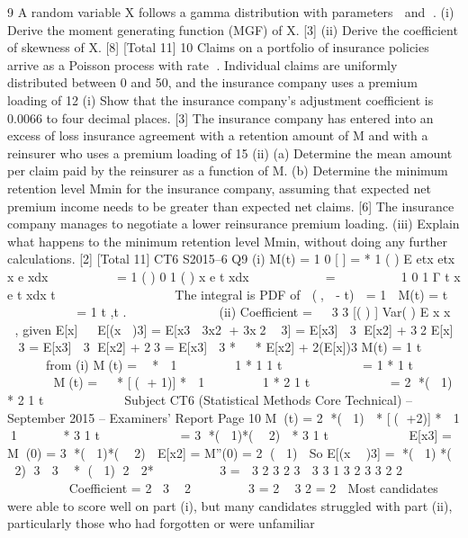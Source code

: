 
9 A random variable X follows a gamma distribution with parameters  and .
(i) Derive the moment generating function (MGF) of X. [3]
(ii) Derive the coefficient of skewness of X. [8]
[Total 11]
10 Claims on a portfolio of insurance policies arrive as a Poisson process with  rate . Individual claims are uniformly distributed between 0 and 50, and the
insurance company uses a premium loading of 12%
(i) Show that the insurance company’s adjustment coefficient is 0.0066 to four
decimal places. [3]
The insurance company has entered into an excess of loss insurance agreement with a retention amount of M and with a reinsurer who uses a premium loading of 15%
(ii) (a) Determine the mean amount per claim paid by the reinsurer as a
function of M.
(b) Determine the minimum retention level Mmin for the insurance
company, assuming that expected net premium income needs to be greater than expected net claims.
[6]
The insurance company manages to negotiate a lower reinsurance premium loading.
(iii) Explain what happens to the minimum retention level Mmin, without doing
any further calculations. [2]
[Total 11]
CT6 S2015–6
\newpage
  Q9 (i) M(t) = 1
0
[ ] = * 1
( )
E etx etx x e xdx

  
  
= 1 ( )
0
1
( )
x e t xdx

   
  
=
          1
0
1
Γ
t x e t xdx
t
 
   


 
   
The integral is PDF of  (,  - t)  = 1
 M(t) =
  t
   
     
= 1 t ,t .
          
(ii) Coefficient =  
3
3
[( ) ]
Var( )
E x
x
  , given E[x]  
E[(x )3] = E[x3  3x2 + 3x2  3]
= E[x3]  3 E[x2] + 32 E[x]  3
= E[x3]  3 E[x2] + 23
= E[x3]  3 *
  

* E[x2] + 2(E[x])3
M(t) = 1 t         
from (i)
M(t) =  *  1


 

 
1
*
  1
1 t         
=
  1
* 1 t           
M(t) =
  

* [( + 1)] *  1


 

 
1
*
  2
1 t         
= 2
*( 1)

*
  2
1 t         
Subject CT6 (Statistical Methods Core Technical) – September 2015 – Examiners’ Report
Page 10
M(t) = 2
*( 1)

* [( +2)] *
   1 1     
*
  3
1 t         
= 3
*( 1)*(  2)

*
  3
1 t         
E[x3] = M(0) = 3
*( 1)*(  2)

E[x2] = M''(0) = 2
( 1)

So
E[(x  )3] = *( 1) *(  2)
3
 3

* ( 1)
2
 2* 


 

 
3
=  3 2 3 2 3 
3 3
1 3 2 3 3 2 2

           
 
Coefficient =
  2
3

2

 

 
3 = 2

3
2
= 2

Most candidates were able to score well on part (i), but many candidates
struggled with part (ii), particularly those who had forgotten or were unfamiliar
